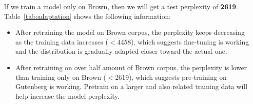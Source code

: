 If we train a model only on Brown, then we will get a test perplexity of \textbf{2619}. Table~\ref{tab:adaptation} shows the following information:

\begin{itemize}
\item After retraining the model on Brown corpus, the perplexity keeps decreasing as the training data increases ($<$4458), which suggests fine-tuning is working and the distribution is gradually adapted closer toward the actual one.
\item After retraining on over half amount of Brown corpus, the perplexity is lower than training only on Brown ($<$2619), which suggests pre-training on Gutenberg is working. Pretrain on a larger and also related training data will help increase the model perplexity.
\end{itemize}





